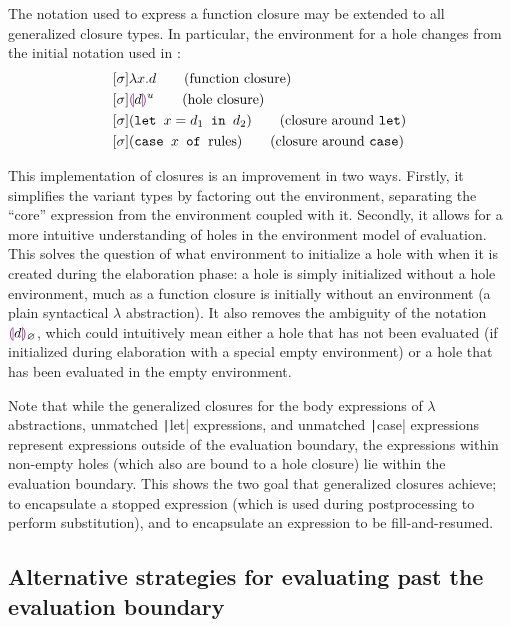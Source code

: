 The notation used to express a function closure may be extended to all generalized closure types. In particular, the environment for a hole changes from the initial notation used in \cite{conf/popl/HazelnutLive19}:
\begin{align}
  \label{eq:generalized-closure-notation}
  &[\env]\lambda x.d\tag{function closure} \\
  &[\env]\hhole{d}^u\tag{hole closure} \\
  &[\env](\texttt{let }x=d_1\texttt{ in }d_2)\tag{closure around \texttt{let}} \\
  &[\env](\texttt{case }x\texttt{ of }\text{rules})\tag{closure around \texttt{case}}
\end{align}

This implementation of closures is an improvement in two ways. Firstly, it simplifies the variant types by factoring out the environment, separating the ``core'' expression from the environment coupled with it. Secondly, it allows for a more intuitive understanding of holes in the environment model of evaluation. This solves the question of what environment to initialize a hole with when it is created during the elaboration phase: a hole is simply initialized without a hole environment, much as a function closure is initially without an environment (a plain syntactical $\lambda$ abstraction). It also removes the ambiguity of the notation $\textcolor{violet}{\llparenthesis} d\textcolor{violet}{\rrparenthesis}_\varnothing$, which could intuitively mean either a hole that has not been evaluated (if initialized during elaboration with a special empty environment) or a hole that has been evaluated in the empty environment.

Note that while the generalized closures for the body expressions of $\lambda$ abstractions, unmatched \texttt|let| expressions, and unmatched \texttt|case| expressions represent expressions outside of the evaluation boundary, the expressions within non-empty holes (which also are bound to a hole closure) lie within the evaluation boundary. This shows the two goal that generalized closures achieve; to encapsulate a stopped expression (which is used during postprocessing to perform substitution), and to encapsulate an expression to be fill-and-resumed.

\subsection{Alternative strategies for evaluating past the evaluation boundary}
\label{sec:alt_strat_unevaluated}

